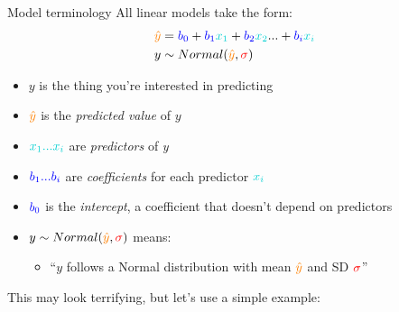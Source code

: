 \documentclass[
  ignorenonframetext,
  aspectratio=169]{beamer}
\providecommand{\tightlist}{%
  \setlength{\itemsep}{0pt}\setlength{\parskip}{0pt}}
\begin{document}
\begin{frame}{Model terminology}
\protect\hypertarget{model-terminology}{}
All linear models take the form: \begin{equation*} 
\begin{split}
\textcolor{orange}{\hat{y}} & = \textcolor{blue}{b_0} + \textcolor{blue}{b_1}\textcolor{darkturquoise}{x_1} + \textcolor{blue}{b_2}\textcolor{darkturquoise}{x_2} ... + \textcolor{blue}{b_i}\textcolor{darkturquoise}{x_i} \\
y & \sim Normal(\textcolor{orange}{\hat{y}},\textcolor{red}{\sigma})
\end{split}
\end{equation*}

\pause

\begin{itemize}[<+->]
\tightlist
\item
  \(y\) is the thing you're interested in predicting
\item
  \(\textcolor{orange}{\hat{y}}\) is the \emph{predicted value} of \(y\)
\item
  \(\textcolor{darkturquoise}{x_1...x_i}\) are \emph{predictors} of
  \emph{y}
\item
  \(\textcolor{blue}{b_1...b_i}\) are \emph{coefficients} for each
  predictor \(\textcolor{darkturquoise}{x_i}\)
\item
  \(\textcolor{blue}{b_0}\) is the \emph{intercept}, a coefficient that
  doesn't depend on predictors
\item
  \(y\sim Normal(\textcolor{orange}{\hat{y}},\textcolor{red}{\sigma})\)
  means:

  \begin{itemize}[<+->]
  \tightlist
  \item
    ``\(y\) follows a Normal distribution with mean
    \(\textcolor{orange}{\hat{y}}\) and SD \(\textcolor{red}{\sigma}\)''
  \end{itemize}
\end{itemize}

\pause

This may look terrifying, but let's use a simple example:
\end{frame}
\end{document}

